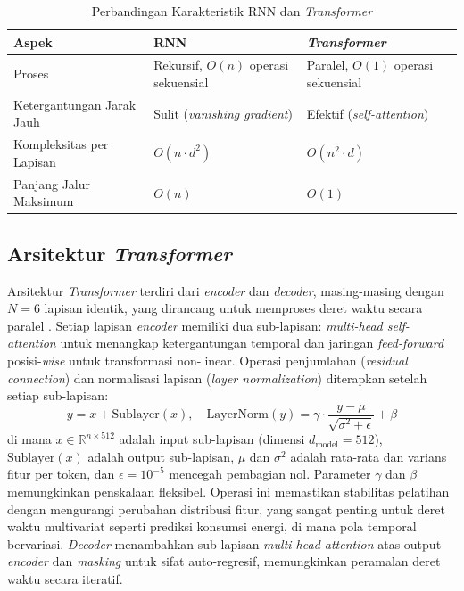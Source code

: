 \begin{table}[H]
\centering
\caption{Perbandingan Karakteristik RNN dan \textit{Transformer}}
\label{tab:rnn_vs_transformer}
\begin{tabularx}{\textwidth}{>{\raggedright\arraybackslash}X>{\raggedright\arraybackslash}X>{\raggedright\arraybackslash}X}
\toprule
\textbf{Aspek} & \textbf{RNN} & \textbf{\textit{Transformer}} \\
\midrule
Proses & Rekursif, \( O(n) \) operasi sekuensial & Paralel, \( O(1) \) operasi sekuensial \\
Ketergantungan Jarak Jauh & Sulit (\textit{vanishing gradient}) & Efektif (\textit{self-attention}) \\
Kompleksitas per Lapisan & \( O(n \cdot d^2) \) & \( O(n^2 \cdot d) \) \\
Panjang Jalur Maksimum & \( O(n) \) & \( O(1) \) \\
\bottomrule
\end{tabularx}
\end{table}

\subsection{Arsitektur \textit{Transformer}}
Arsitektur \textit{Transformer} terdiri dari \textit{encoder} dan \textit{decoder}, masing-masing dengan \( N=6 \) lapisan identik, yang dirancang untuk memproses deret waktu secara paralel \citep{Vaswani2017}. Setiap lapisan \textit{encoder} memiliki dua sub-lapisan: \textit{multi-head self-attention} untuk menangkap ketergantungan temporal dan jaringan \textit{feed-forward} posisi-\textit{wise} untuk transformasi non-linear. Operasi penjumlahan (\textit{residual connection}) dan normalisasi lapisan (\textit{layer normalization}) diterapkan setelah setiap sub-lapisan:
\begin{equation}
y = x + \text{Sublayer}(x), \quad \text{LayerNorm}(y) = \gamma \cdot \frac{y - \mu}{\sqrt{\sigma^2 + \epsilon}} + \beta \label{eq:bab2_eq34}
\end{equation}
di mana \( x \in \mathbb{R}^{n \times 512} \) adalah input sub-lapisan (dimensi \( d_{\text{model}} = 512 \)), \(\text{Sublayer}(x)\) adalah output sub-lapisan, \( \mu \) dan \( \sigma^2 \) adalah rata-rata dan varians fitur per token, dan \( \epsilon = 10^{-5} \) mencegah pembagian nol. Parameter \( \gamma \) dan \( \beta \) memungkinkan penskalaan fleksibel. Operasi ini memastikan stabilitas pelatihan dengan mengurangi perubahan distribusi fitur, yang sangat penting untuk deret waktu multivariat seperti prediksi konsumsi energi, di mana pola temporal bervariasi. \textit{Decoder} menambahkan sub-lapisan \textit{multi-head attention} atas output \textit{encoder} dan \textit{masking} untuk sifat auto-regresif, memungkinkan peramalan deret waktu secara iteratif.

